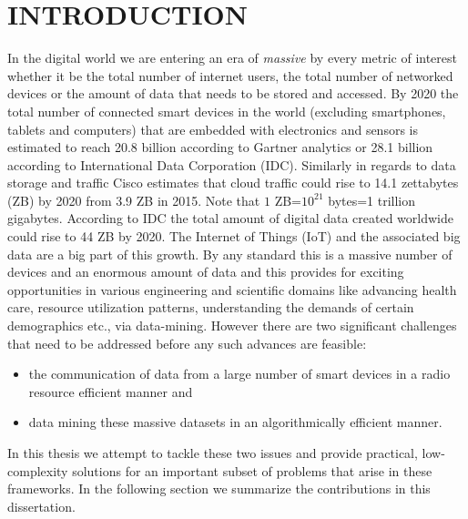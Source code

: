 %
%
%
%



\pagestyle{plain} %
\setcounter{page}{1}

\chapter{INTRODUCTION}
\indent In the digital world we are entering an era of \emph{massive} by every metric of interest whether it be the total number of internet users, the total number of networked devices or the amount of data that needs to be stored and accessed. By 2020 the total number of connected smart devices in the world (excluding smartphones, tablets and computers) that are embedded with electronics and sensors is estimated to reach 20.8 billion according to Gartner analytics or 28.1 billion according to International Data Corporation (IDC). Similarly in regards to data storage and traffic Cisco estimates that cloud traffic could rise to 14.1 zettabytes (ZB) by 2020 from 3.9 ZB in 2015. Note that $1$ ZB=$10^{21}$ bytes=1 trillion gigabytes. According to IDC the total amount of digital data created worldwide could rise to 44 ZB by 2020. The Internet of Things (IoT) and the associated big data are a big part of this growth. By any standard this is a massive number of devices and an enormous amount of data and this provides for exciting opportunities in various engineering and scientific domains like advancing health care, resource utilization patterns, understanding the demands of certain demographics etc., via data-mining. However there are two significant challenges that need to be addressed before any such advances are feasible:
\begin{itemize}
\item the communication of data from a large number of smart devices in a radio resource efficient manner and 
\item data mining these massive datasets in an algorithmically efficient manner.
\end{itemize}
In this thesis we attempt to tackle these two issues and provide practical, low-complexity solutions for an important  subset of problems that arise in these frameworks. In the following section we summarize the contributions in this dissertation.
